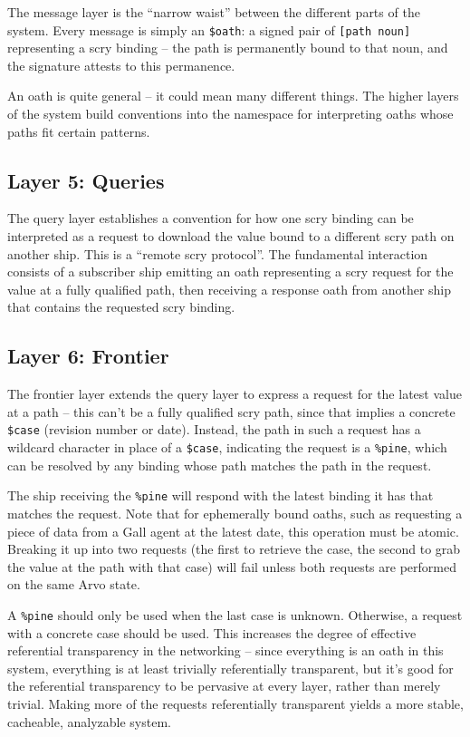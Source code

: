 \documentclass[twoside]{article}
\begin{document}
The message layer is the ``narrow waist'' between the different parts of the system. Every message is simply an \lstinline[style=inlinecode]{$oath}: a signed pair of \lstinline[style=inlinecode]{[path noun]} representing a scry binding – the path is permanently bound to that noun, and the signature attests to this permanence.

An oath is quite general – it could mean many different things. The higher layers of the system build conventions into the namespace for interpreting oaths whose paths fit certain patterns.

\subsection{Layer 5: Queries}

The query layer establishes a convention for how one scry binding can be interpreted as a request to download the value bound to a different scry path on another ship. This is a ``remote scry protocol''. The fundamental interaction consists of a subscriber ship emitting an oath representing a scry request for the value at a fully qualified path, then receiving a response oath from another ship that contains the requested scry binding.

\subsection{Layer 6: Frontier}

The frontier layer extends the query layer to express a request for the latest value at a path – this can't be a fully qualified scry path, since that implies a concrete \lstinline[style=inlinecode]{$case} (revision number or date). Instead, the path in such a request has a wildcard character in place of a \lstinline[style=inlinecode]{$case}, indicating the request is a \lstinline[style=inlinecode]{%pine}, which can be resolved by any binding whose path matches the path in the request.

The ship receiving the \lstinline[style=inlinecode]{%pine} will respond with the latest binding it has that matches the request. Note that for ephemerally bound oaths, such as requesting a piece of data from a Gall agent at the latest date, this operation must be atomic. Breaking it up into two requests (the first to retrieve the case, the second to grab the value at the path with that case) will fail unless both requests are performed on the same Arvo state.

A \lstinline[style=inlinecode]{%pine} should only be used when the last case is unknown. Otherwise, a request with a concrete case should be used. This increases the degree of effective referential transparency in the networking – since everything is an oath in this system, everything is at least trivially referentially transparent, but it's good for the referential transparency to be pervasive at every layer, rather than merely trivial. Making more of the requests referentially transparent yields a more stable, cacheable, analyzable system.
\end{document}
